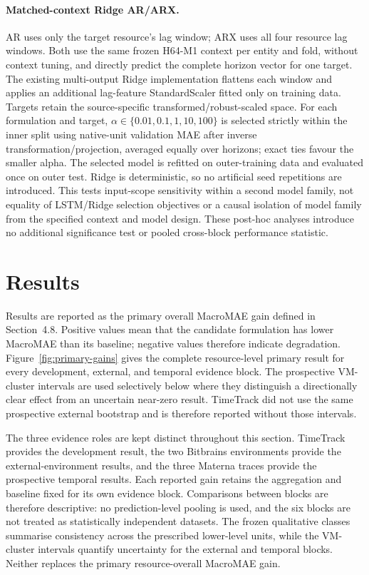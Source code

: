 \documentclass[a4paper,fleqn]{cas-dc}
\begin{document}
\paragraph{Matched-context Ridge AR/ARX.}
AR uses only the target resource's lag window; ARX uses all four resource lag
windows. Both use the same frozen H64-M1 context per entity and fold, without
context tuning, and directly predict the complete horizon vector for one
target. The existing multi-output Ridge implementation flattens each window
and applies an additional lag-feature StandardScaler fitted only on training
data. Targets retain the source-specific transformed/robust-scaled space.
For each formulation and target, $\alpha\in\{0.01,0.1,1,10,100\}$ is selected
strictly within the inner split using native-unit validation MAE after inverse
transformation/projection, averaged equally over horizons; exact ties favour
the smaller alpha. The selected model is refitted on outer-training data and
evaluated once on outer test. Ridge is deterministic, so no artificial seed
repetitions are introduced. This tests input-scope sensitivity within a
second model family, not equality of LSTM/Ridge selection objectives or a
causal isolation of model family from the specified context and model design.
These post-hoc analyses introduce no additional significance test or pooled
cross-block performance statistic.

\section{Results}

Results are reported as the primary overall MacroMAE gain defined in
Section~4.8. Positive values mean that the candidate formulation has lower
MacroMAE than its baseline; negative values therefore indicate degradation.
Figure~\ref{fig:primary-gains} gives the complete resource-level primary result
for every development, external, and temporal evidence block. The prospective
VM-cluster intervals are used selectively below where they distinguish a
directionally clear effect from an uncertain near-zero result. TimeTrack did
not use the same prospective external bootstrap and is therefore reported
without those intervals.

The three evidence roles are kept distinct throughout this section. TimeTrack
provides the development result, the two Bitbrains environments provide the
external-environment results, and the three Materna traces provide the
prospective temporal results. Each reported gain retains the aggregation and
baseline fixed for its own evidence block. Comparisons between blocks are
therefore descriptive: no prediction-level pooling is used, and the six blocks
are not treated as statistically independent datasets. The frozen qualitative
classes summarise consistency across the prescribed lower-level units, while
the VM-cluster intervals quantify uncertainty for the external and temporal
blocks. Neither replaces the primary resource-overall MacroMAE gain.
\end{document}
